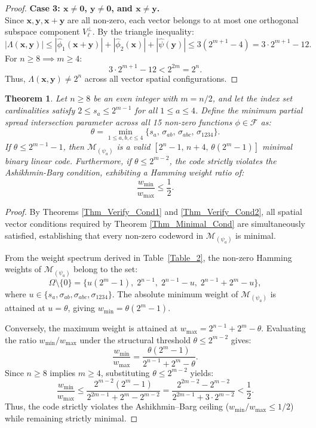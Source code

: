 \documentclass[pdflatex,sn-mathphys-num]{sn-jnl}%
\theoremstyle{thmstyleone}%
\newtheorem{theorem}{Theorem}%
\theoremstyle{thmstyletwo}%
\theoremstyle{thmstylethree}%
\begin{document}
\begin{proof}
\textbf{Case 3: $\mathbf{x} \neq \mathbf{0}$, $\mathbf{y} \neq \mathbf{0}$, and $\mathbf{x} \neq \mathbf{y}$.} \\
Since $\mathbf{x}, \mathbf{y}, \mathbf{x}+\mathbf{y}$ are all non-zero, each vector belongs to at most one orthogonal subspace component $V_\ell^\perp$. By the triangle inequality:
\[
|\Lambda(\mathbf{x}, \mathbf{y})| \leq |\widehat{\phi}_1(\mathbf{x}+\mathbf{y})| + |\widehat{\phi}_2(\mathbf{x})| + |\widehat{\psi}(\mathbf{y})| \leq 3(2^{m+1} - 4) = 3 \cdot 2^{m+1} - 12.
\]
For $n \geq 8 \implies m \geq 4$:
\[
3 \cdot 2^{m+1} - 12 < 2^{2m} = 2^n.
\]
Thus, $\Lambda(\mathbf{x}, \mathbf{y}) \neq 2^n$ across all vector spatial configurations.
\end{proof}
\begin{theorem}\label{Thm_Main_Code_Result}
Let $n \ge 8$ be an even integer with $m = n/2$, and let the index set cardinalities satisfy $2 \le s_a \le 2^{m-1}$ for all $1 \le a \le 4$. Define the minimum partial spread intersection parameter across all 15 non-zero functions $\phi \in \mathcal{F}$ as:
\[
\theta = \min_{1 \le a,b,c \le 4} \{ s_a, \, \sigma_{ab}, \, \sigma_{abc}, \, \sigma_{1234} \}.
\]
If $\theta \le 2^{m-1} - 1$, then $\mathcal{M}_{(\psi_a)}$ is a valid $[2^n - 1, \, n + 4, \, \theta(2^m - 1)]$ minimal binary linear code. Furthermore, if $\theta \le 2^{m-2}$, the code strictly violates the Ashikhmin-Barg condition, exhibiting a Hamming weight ratio of:
\[
\frac{w_{\min}}{w_{\max}} \le \frac{1}{2}.
\]
\end{theorem}
\begin{proof}
By Theorems \ref{Thm_Verify_Cond1} and \ref{Thm_Verify_Cond2}, all spatial vector conditions required by Theorem \ref{Thm_Minimal_Cond} are simultaneously satisfied, establishing that every non-zero codeword in $\mathcal{M}_{(\psi_a)}$ is minimal.

From the weight spectrum derived in Table~\ref{Table_2}, the non-zero Hamming weights of $\mathcal{M}_{(\psi_a)}$ belong to the set:
\[
\Omega \setminus \{0\} = \{ u(2^m - 1), \; 2^{n-1}, \; 2^{n-1} - u, \; 2^{n-1} + 2^m - u \},
\]
where $u \in \{s_a, \sigma_{ab}, \sigma_{abc}, \sigma_{1234}\}$. The absolute minimum weight of $\mathcal{M}_{(\psi_a)}$ is attained at $u = \theta$, giving $w_{\min} = \theta(2^m - 1)$.

Conversely, the maximum weight is attained at $w_{\max} = 2^{n-1} + 2^m - \theta$. Evaluating the ratio $w_{\min} / w_{\max}$ under the structural threshold $\theta \le 2^{m-2}$ gives:
\[
\frac{w_{\min}}{w_{\max}} = \frac{\theta(2^m - 1)}{2^{n-1} + 2^m - \theta}.
\]
Since $n \ge 8$ implies $m \ge 4$, substituting $\theta \le 2^{m-2}$ yields:
\[
\frac{w_{\min}}{w_{\max}} \le \frac{2^{m-2}(2^m - 1)}{2^{2m-1} + 2^m - 2^{m-2}} = \frac{2^{2m-2} - 2^{m-2}}{2^{2m-1} + 3 \cdot 2^{m-2}} < \frac{1}{2}.
\]
Thus, the code strictly violates the Ashikhmin--Barg ceiling ($w_{\min} / w_{\max} \le 1/2$) while remaining strictly minimal.
\end{proof}
\end{document}
